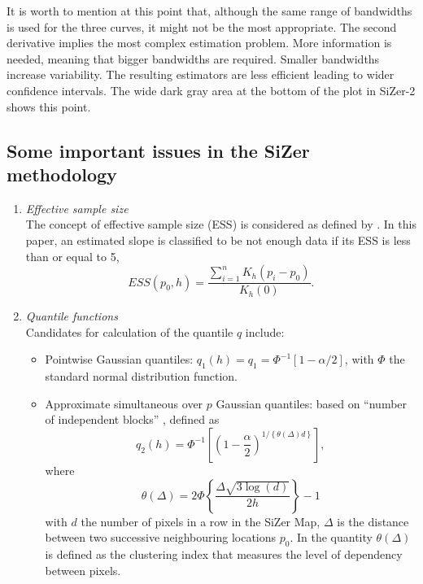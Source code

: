 \documentclass[preprint,12pt]{elsarticle}
\begin{document}
It is worth to mention at this point that, although  the same range of bandwidths is used for the three curves, it might not be the most appropriate. The second derivative implies the most complex estimation problem. More information is needed, meaning that bigger bandwidths are required. Smaller bandwidths increase variability. The resulting estimators are less efficient leading to wider confidence intervals. The wide dark gray area at the bottom of the plot in SiZer-2 shows this point.


\subsection{Some important issues in the SiZer methodology}
\begin{enumerate}
\item {\it Effective sample size} \\
\noindent The  concept of effective sample size (ESS) is considered as defined by \cite{CM99}. In this paper, an estimated slope is classified to be not enough data if its ESS is less than or equal to 5, 
$$
ESS(p_0,h) = \frac{\sum_{i=1}^n K_h(p_i-p_0)}{K_h(0)}.
$$
\item {\it Quantile functions} \\
\noindent Candidates for calculation of the quantile $q$ include:
\begin{itemize}
	\item Pointwise Gaussian quantiles: $q_1(h) = q_1 = \Phi^{-1}[1-\alpha/2]$, with $\Phi$ the standard normal distribution function. 
	\item Approximate simultaneous over $p$ Gaussian quantiles: based on ``number of independent blocks'' \cite{HM2006}, defined as
	$$
	q_2(h) = \Phi^{-1} \left[\left(1- \frac{\alpha}{2}\right)^{1/\left\{\theta(\Delta)d\right\}}\right],
	$$
	where
	$$
	\theta(\Delta) =2 \Phi \left\{ \frac{\Delta \sqrt{3 \log(d)}}{2h}\right\}-1
	$$
	with $d$ the number of pixels in a row in the SiZer Map, $\Delta$ is the distance between two successive neighbouring locations $p_0$. In \cite{HM2006} the quantity $\theta(\Delta)$ is defined as the clustering index that measures the level of dependency between pixels. 
\end{itemize}
\end{enumerate}
\end{document}
